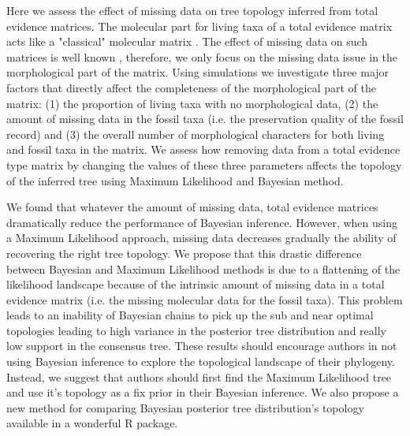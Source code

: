 \documentclass[12pt,letterpaper]{article}
\begin{document}
Here we assess the effect of missing data on tree topology inferred from total evidence matrices.
The molecular part for living taxa of a total evidence matrix acts like a "classical" molecular matrix \citep{ronquista2012}.
The effect of missing data on such matrices is well known \citep{wiensmissing2006,wiensmissing2008,rouresite-specific2011}, therefore, we only focus on the missing data issue in the morphological part of the matrix.
Using simulations we investigate three major factors that directly affect the completeness of the morphological part of the matrix:
(1) the proportion of living taxa with no morphological data,
(2) the amount of missing data in the fossil taxa (i.e. the preservation quality of the fossil record) and
(3) the overall number of morphological characters for both living and fossil taxa in the matrix.
We assess how removing data from a total evidence type matrix by changing the values of these three parameters affects the topology of the inferred tree using Maximum Likelihood and Bayesian method.

We found that whatever the amount of missing data, total evidence matrices dramatically reduce the performance of Bayesian inference.
However, when using a Maximum Likelihood approach, missing data decreases gradually the ability of recovering the right tree topology.
We propose that this drastic difference between Bayesian and Maximum Likelihood methods is due to a flattening of the likelihood landscape because of the intrinsic amount of missing data in a total evidence matrix (i.e. the missing molecular data for the fossil taxa).
This problem leads to an inability of Bayesian chains to pick up the sub and near optimal topologies leading to high variance in the posterior tree distribution and really low support in the consensus tree.
These results should encourage authors in not using Bayesian inference to explore the topological landscape of their phylogeny.
Instead, we suggest that authors should first find the Maximum Likelihood tree and use it's topology as a fix prior in their Bayesian inference.
We also propose a new method for comparing Bayesian posterior tree distribution's topology available in a wonderful R package. %

%
%
\end{document}
